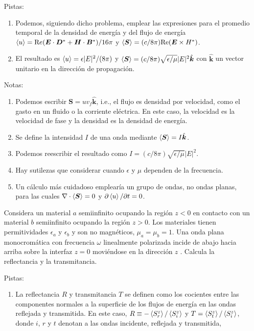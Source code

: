 \documentclass{exam}
\newenvironment{pistas}{\par\noindent Pistas:\begin{enumerate}} {\end{enumerate}}
\newenvironment{notas}{\par\noindent Notas:\begin{enumerate}} {\end{enumerate}}
\begin{document}
\begin{questions}
\begin{pistas}
    partes reales, como fue discutido en el problema 24 de la tarea 7.
  \item Podemos, siguiendo dicho problema, emplear las expresiones
    para el promedio temporal de la densidad de energía y del flujo de
    energía $\braket{u}=\text Re({\bm E\cdot\bm D^*+\bm H\cdot\bm
      B^*})/16\pi$ y $\braket{\bm S}=(c/8\pi)\text{Re}(\bm E\times
    H^*)$.
  \item El resultado es $\braket{u}=\epsilon |E|^2/(8\pi)$ y
    $\braket{\bm S}=(c/8\pi) \sqrt{\epsilon/\mu}|E|^2\hat{\bm k}$ con
    $\hat{\bm k}$ un vector unitario en la dirección de propagación.
  \end{pistas}
  \begin{notas}
  \item Podemos escribir $\bm S=u v_f\hat{\bm k}$, i.e., el flujo es
    densidad por velocidad, como el gasto en un fluido o la corriente
    eléctrica.  En este caso, la velocidad es la velocidad de fase y
    la densidad es la densidad de energía.
  \item Se define la intensidad $I$ de una onda mediante $\braket{\bm
      S}=I\hat{\bm k}$.
  \item Podemos reescribir el resultado como
    $I=(c/8\pi)\sqrt{\epsilon/\mu}|E|^2$.
  \item Hay sutilezas que considerar cuando $\epsilon$ y $\mu$
    dependen de la frecuencia.
  \item Un cálculo más cuidadoso emplearía un grupo de ondas, no ondas
    planas, para las cuales $\nabla\cdot\braket{\bm S}=0$ y $\partial
    \braket{u}/\partial t=0$.
  \end{notas}
\question\label{g} Considera un material $a$ semiinfinito ocupando la región
  $z<0$ en contacto con un material $b$ semiinfinito ocupando la
  región $z>0$. Los materiales tienen permitividades $\epsilon_a$ y
  $\epsilon_b$ y son no magnéticos, $\mu_a=\mu_b=1$. Una onda plana
  monocromática con frecuencia $\omega$ linealmente polarizada incide
  de abajo hacia arriba sobre la interfaz $z=0$ moviéndose en la
  dirección $z$ . Calcula la reflectancia y la transmitancia.
  \begin{pistas}
  \item La reflectancia $R$ y transmitancia $T$ se definen como los
    cocientes
    entre las componentes normales a la superficie de los flujos de
    energía en las ondas reflejada y transmitida. En este caso,
    $R\equiv -\braket{S_r^z}/\braket{S_i^z}$ y
    $T=\braket{S_t^z}/\braket{S_i^z}$, donde $i$, $r$ y $t$
    denotan a las ondas incidente, reflejada y transmitida,

\end{pistas}
\end{questions}
\end{document}
